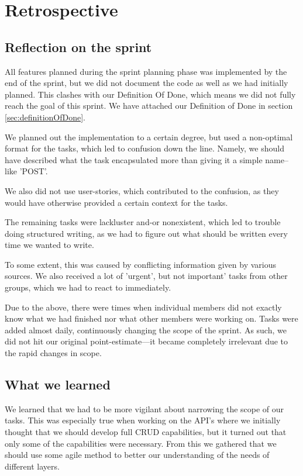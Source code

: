 \section{Retrospective}

\subsection{Reflection on the sprint}
All features planned during the sprint planning phase was implemented by the end of the sprint, but we did not document the code as well as we had initially planned. 
This clashes with our Definition Of Done, which means we did not fully reach the goal of this sprint. We have attached our Definition of Done in section \ref{sec:definitionOfDone}.

We planned out the implementation to a certain degree, but used a non-optimal format for the tasks, which led to confusion down the line. Namely, we should have described what the task encapsulated more than giving it a simple name--like 'POST'. 

We also did not use user-stories, which contributed to the confusion, as they would have otherwise provided a certain context for the tasks.

The remaining tasks were lackluster and-or nonexistent, which led to trouble doing structured writing, as we had to figure out what should be written every time we wanted to write.
    
To some extent, this was caused by conflicting information given by various sources. We also received a lot of 'urgent', but not important' tasks from other groups, which we had to react to immediately.
    
Due to the above, there were times when individual members did not exactly know what we had finished nor what other members were working on. Tasks were added almost daily, continuously changing the scope of the sprint.
As such, we did not hit our original point-estimate---it became completely irrelevant due to the rapid changes in scope.

\subsection{What we learned}\label{Whatwelearnedsprint3}
We learned that we had to be more vigilant about narrowing the scope of our tasks. 
This was especially true when working on the API's where we initially thought that we should develop full CRUD capabilities, but it turned out that only some of the capabilities were necessary. 
From this we gathered that we should use some agile method to better our understanding of the needs of different layers.

